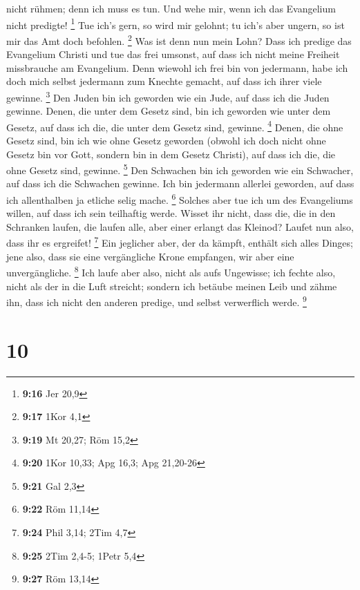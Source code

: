 nicht rühmen; denn ich muss es tun. Und wehe mir, wenn ich das
Evangelium nicht predigte! \footnote{\textbf{9:16} Jer 20,9}
 Tue ich's gern, so wird mir gelohnt; tu ich's aber
ungern, so ist mir das Amt doch befohlen. \footnote{\textbf{9:17} 1Kor
  4,1}  Was ist denn nun mein Lohn? Dass ich predige das
Evangelium Christi und tue das frei umsonst, auf dass ich nicht meine
Freiheit missbrauche am Evangelium.  Denn wiewohl ich
frei bin von jedermann, habe ich doch mich selbst jedermann zum Knechte
gemacht, auf dass ich ihrer viele gewinne. \footnote{\textbf{9:19} Mt
  20,27; Röm 15,2}  Den Juden bin ich geworden wie ein
Jude, auf dass ich die Juden gewinne. Denen, die unter dem Gesetz sind,
bin ich geworden wie unter dem Gesetz, auf dass ich die, die unter dem
Gesetz sind, gewinne. \footnote{\textbf{9:20} 1Kor 10,33; Apg 16,3; Apg
  21,20-26}  Denen, die ohne Gesetz sind, bin ich wie
ohne Gesetz geworden (obwohl ich doch nicht ohne Gesetz bin vor Gott,
sondern bin in dem Gesetz Christi), auf dass ich die, die ohne Gesetz
sind, gewinne. \footnote{\textbf{9:21} Gal 2,3}  Den
Schwachen bin ich geworden wie ein Schwacher, auf dass ich die Schwachen
gewinne. Ich bin jedermann allerlei geworden, auf dass ich allenthalben
ja etliche selig mache. \footnote{\textbf{9:22} Röm 11,14}
 Solches aber tue ich um des Evangeliums willen, auf dass
ich sein teilhaftig werde.  Wisset ihr nicht, dass die,
die in den Schranken laufen, die laufen alle, aber einer erlangt das
Kleinod? Laufet nun also, dass ihr es ergreifet! \footnote{\textbf{9:24}
  Phil 3,14; 2Tim 4,7}  Ein jeglicher aber, der da
kämpft, enthält sich alles Dinges; jene also, dass sie eine vergängliche
Krone empfangen, wir aber eine unvergängliche. \footnote{\textbf{9:25}
  2Tim 2,4-5; 1Petr 5,4}  Ich laufe aber also, nicht als
aufs Ungewisse; ich fechte also, nicht als der in die Luft streicht;
 sondern ich betäube meinen Leib und zähme ihn, dass ich
nicht den anderen predige, und selbst verwerflich werde. \footnote{\textbf{9:27}
  Röm 13,14}

\hypertarget{section-9}{%
\section{10}\label{section-9}}

